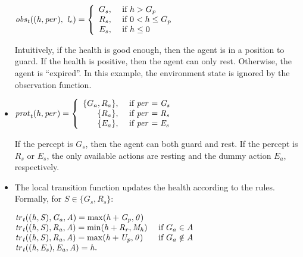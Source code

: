\begin{example}
\begin{itemize}[$\bullet$]
    $\it{obs}_{t}((h,\it{per}_{}), \ l_{e}) = \left\{
      \begin{array}{rl}
        G_s, & \text{ if } h > G_p\\ 
        R_s, & \text{ if } 0 < h \leq G_p\\ 
        E_s, & \text{ if } h \leq 0\\
      \end{array} \right.$
    
    Intuitively, if the health is good enough, then the agent is in a position to
    guard. If the health is  positive, then the agent can only rest. Otherwise, the
    agent is ``expired''. In this example, the environment state is ignored by
    the observation function.
    
  \item $\it{prot}_{t}(h,\it{per}_{}) = \left\{
      \begin{array}{rl}
        \{G_a, R_a\}, & \text{ if } \it{per}_{} = G_s\\ 
        \{R_a\}, & \text{ if } \it{per}_{} = R_s\\ 
        \{E_a\}, & \text{ if } \it{per}_{} = E_s\\
      \end{array} \right.$

    If the percept is $G_s$, then the agent can both guard and rest. If the
    percept is $R_s$ or $E_s$, the only available actions are resting and the
    dummy action $E_a$, respectively.
    
  \item The local transition function updates the health according to the
    rules. Formally, for $S \in \{G_s,R_s\}$:

    $\begin{array}{@{}l@{\quad}l}\small
       \tr{t}((h,S), G_a, A) = \max(h + G_p,0) &\\%
       \tr{t}((h,S), R_a, A) = \min(h + R_r, M_h) &\text{ if }G_a\in A\\
       \tr{t}((h,S), R_a, A) = \max(h + U_p,0) &\text{ if }G_a\notin A\\%
       
       \tr{t}((h,E_s), E_a, A) = h.\\
     \end{array}$

\end{itemize}

\end{example}

